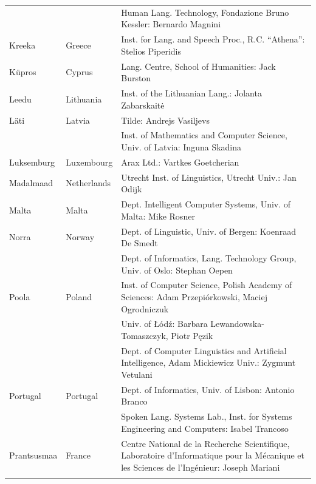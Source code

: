 \begin{longtable}{llp{105mm}}
  & & Human Lang. Technology, Fondazione Bruno Kessler: Bernardo Magnini\\ \addlinespace 
  Kreeka & \textcolor{grey1}{Greece} & Inst. for Lang. and Speech Proc., R.C. ``Athena'': Stelios Piperidis\\ \addlinespace
  Küpros & \textcolor{grey1}{Cyprus} & Lang. Centre, School of Humanities: Jack Burston\\ \addlinespace
  Leedu & \textcolor{grey1}{Lithuania} & Inst. of the Lithuanian Lang.: Jolanta Zabarskaitė\\ \addlinespace
  Läti & \textcolor{grey1}{Latvia} & Tilde: Andrejs Vasiljevs\\ \addlinespace 
  & & Inst. of Mathematics and Computer Science, Univ. of Latvia: Inguna Skadina\\ 
\addlinespace
  Luksemburg & \textcolor{grey1}{Luxembourg} & Arax Ltd.: Vartkes Goetcherian\\
\addlinespace 
  Madalmaad & \textcolor{grey1}{Netherlands} & Utrecht Inst. of Linguistics, Utrecht Univ.: Jan Odijk\\ 
 \addlinespace
  Malta & \textcolor{grey1}{Malta} & Dept. Intelligent Computer Systems, Univ. of Malta: Mike Rosner\\ \addlinespace
  Norra & \textcolor{grey1}{Norway} & Dept. of Linguistic, Univ. of Bergen: Koenraad De Smedt\\ \addlinespace 
  & & Dept. of Informatics, Lang. Technology Group, Univ. of Oslo: Stephan Oepen \\ \addlinespace
  Poola & \textcolor{grey1}{Poland} & Inst. of Computer Science, Polish Academy of Sciences: Adam Przepiórkowski, Maciej Ogrodniczuk \\ \addlinespace
  & & Univ. of Łódź: Barbara Lewandowska-Tomaszczyk, Piotr Pęzik\\ \addlinespace
  & & Dept. of Computer Linguistics and Artificial Intelligence, Adam Mickiewicz Univ.: Zygmunt Vetulani \\ \addlinespace
  Portugal & \textcolor{grey1}{Portugal} & Dept. of Informatics, Univ. of Lisbon: Antonio Branco\\ \addlinespace
  & & Spoken Lang. Systems Lab., Inst. for Systems Engineering and Computers: Isabel Trancoso \\ \addlinespace
  Prantsusmaa & \textcolor{grey1}{France} & Centre National de la Recherche Scientifique, Laboratoire d'Informatique pour la Mécanique et les Sciences de l'Ingénieur: Joseph Mariani \\ \addlinespace

\end{longtable}
